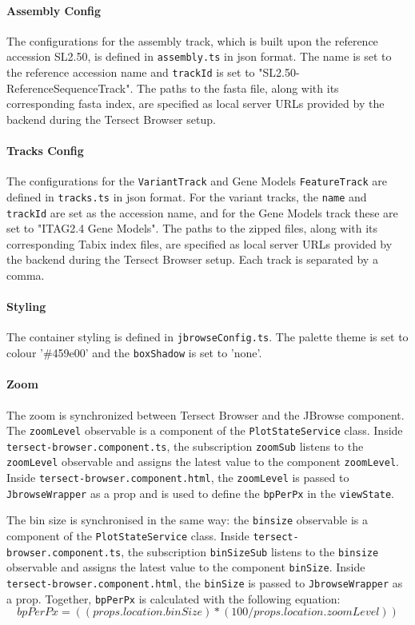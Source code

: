 \documentclass[12pt]{article}
\begin{document}
\begin{itemize}
\paragraph{Assembly Config}

The configurations for the assembly track, which is built upon the reference accession SL2.50, is defined in \verb +assembly.ts+ in json format. The name is set to the reference accession name and \verb +trackId+ is set to "SL2.50-ReferenceSequenceTrack". The paths to the fasta file, along with its corresponding fasta index, are specified as local server URLs provided by the backend during the Tersect Browser setup. 

\paragraph{Tracks Config} 
The configurations for the \verb +VariantTrack+ and Gene Models \verb +FeatureTrack+ are defined in \verb +tracks.ts+ in json format. For the variant tracks, the \verb +name+ and \verb +trackId+ are set as the accession name, and for the Gene Models track these are set to "ITAG2.4 Gene Models".  The paths to the zipped files, along with its corresponding Tabix index files, are specified as local server URLs provided by the backend during the Tersect Browser setup. Each track is separated by a comma. 

\paragraph{Styling}
The container styling is defined in \verb +jbrowseConfig.ts+. The palette theme is set to colour '\#459e00' and the \verb +boxShadow+ is set to 'none'. 

\paragraph{Zoom} 
The zoom is synchronized between Tersect Browser and the JBrowse component. The \verb +zoomLevel+ observable is a component of the \verb +PlotStateService+ class. Inside \verb +tersect-browser.component.ts+, the subscription \verb +zoomSub+ listens to the \verb +zoomLevel+ observable and assigns the latest value to the component \verb +zoomLevel+. Inside \verb +tersect-browser.component.html+, the \verb +zoomLevel+ is passed to \verb +JbrowseWrapper+ as a prop and is used to define the \verb +bpPerPx+ in the \verb +viewState+. 

The bin size is synchronised in the same way: the \verb +binsize+ observable is a component of the \verb +PlotStateService+ class. Inside \verb +tersect-browser.component.ts+, the subscription \verb +binSizeSub+ listens to the \verb +binsize+ observable and assigns the latest value to the component \verb +binSize+. Inside \verb +tersect-browser.component.html+, the \verb +binSize+ is passed to \verb +JbrowseWrapper+ as a prop. 
Together, \verb +bpPerPx+ is calculated with the following equation: \begin{equation} bpPerPx = ((props.location.binSize) * (100 /props.location.zoomLevel)) \end{equation}



\end{itemize}
\end{document}

